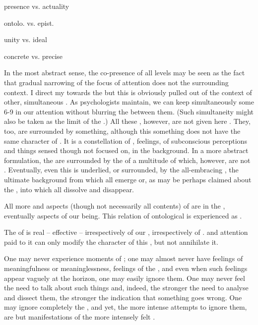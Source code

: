 {presence vs. actuality

ontolo. vs. epist.

unity vs. ideal

concrete vs. precise


\label{sub:copresence}

\pa In the most abstract sense, the co-presence of all levels may be seen as the
fact that gradual narrowing of the focus of attention does not  the
surrounding context.  I direct my  towards the 
but this  is obviously pulled out of the context of other,
simultaneous .  As psychologists maintain, we can keep
simultaneously some 6-9  in our attention without blurring the
 between them.  (Such simultaneity might also be taken as the
limit of the \hoa.)  All these , however, are not given here
.  They, too, are surrounded by something, although this
something does not have the same character of .  It is a
constellation of , feelings, of subconscious perceptions and things
sensed though not focused on, in the background.  In a more abstract
formulation, the  are surrounded by the  of a
multitude of  which, however, are not .  Eventually,
even this  is underlied, or surrounded, by the all-embracing
, the ultimate background from which all 
emerge or, as may be perhaps claimed about the , into
which all dissolve and disappear.


\pa All more  and  aspects (though not necessarily all
contents) of  are  in the ,
eventually  aspects of our being. This relation of ontological
 is experienced as .

The  of  is real -- effective -- irrespectively of
our , irrespectively of .
 and attention paid to it can only modify the character of this
, but not annihilate it.

One may never experience moments of ; one may almost never have
feelings of meaningfulness or meaninglessness, feelings of the , and even when such feelings appear vaguely at the horizon, one
may easily ignore them. One may never feel the need to talk about such things
and, indeed, the stronger the need to analyse and dissect them, the stronger the
indication that something goes wrong. One may ignore completely the
, 
and yet, the 
more intense attempts to ignore them, are but manifestations of the 
more intensely felt .

}
